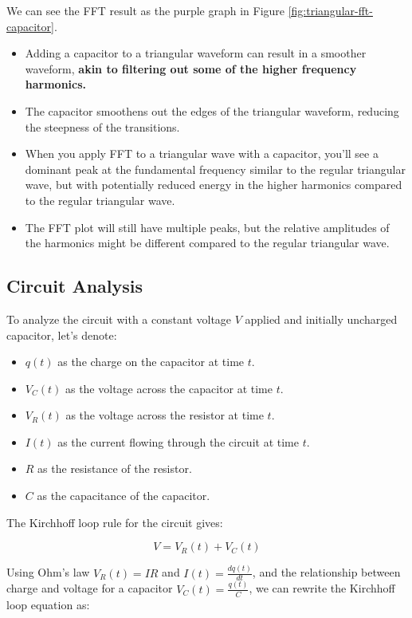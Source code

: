 We can see the FFT result as the purple graph in Figure \ref{fig:triangular-fft-capacitor}.

\begin{itemize}
    \item Adding a capacitor to a triangular waveform can result in a smoother waveform, \textbf{akin to filtering out some of the higher frequency harmonics.} 
    \item The capacitor smoothens out the edges of the triangular waveform, reducing the steepness of the transitions.
    \item When you apply FFT to a triangular wave with a capacitor, you'll see a dominant peak at the fundamental frequency similar to the regular triangular wave, but with potentially reduced energy in the higher harmonics compared to the regular triangular wave.
    \item The FFT plot will still have multiple peaks, but the relative amplitudes of the harmonics might be different compared to the regular triangular wave.
\end{itemize}

\newpage
\thispagestyle{plain}

\subsection{Circuit Analysis}

To analyze the circuit with a constant voltage \( V \) applied and initially uncharged capacitor, let's denote:

\begin{itemize}
    \item \( q(t) \) as the charge on the capacitor at time \( t \).
    \item \( V_C(t) \) as the voltage across the capacitor at time \( t \).
    \item \( V_R(t) \) as the voltage across the resistor at time \( t \).
    \item \( I(t) \) as the current flowing through the circuit at time \( t \).
    \item \( R \) as the resistance of the resistor.
    \item \( C \) as the capacitance of the capacitor.
\end{itemize}

The Kirchhoff loop rule for the circuit gives:

\[ V = V_R(t) + V_C(t) \]

Using Ohm's law \( V_R(t) = IR \) and \( I(t) = \frac{dq(t)}{dt} \), and the relationship between charge and voltage for a capacitor \( V_C(t) = \frac{q(t)}{C} \), we can rewrite the Kirchhoff loop equation as:

